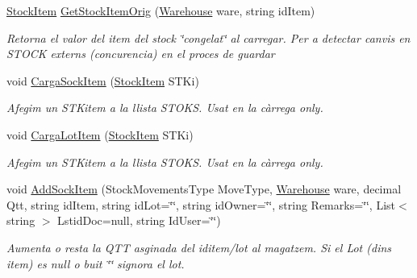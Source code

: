 \begin{DoxyCompactItemize}
\mbox{\hyperlink{class_h_k_supply_1_1_p_r_j___stocks_1_1_classes_1_1_stocks_1_1_stock_item}{Stock\+Item}} \mbox{\hyperlink{class_h_k_supply_1_1_p_r_j___stocks_1_1_classes_1_1_stocks_a9f91bf0312629b1ea7fc09f56a5e442c}{Get\+Stock\+Item\+Orig}} (\mbox{\hyperlink{class_h_k_supply_1_1_p_r_j___stocks_1_1_classes_1_1_stocks_1_1_warehouse}{Warehouse}} ware, string id\+Item)
\begin{DoxyCompactList}\small\item\em Retorna el valor del item del stock \char`\"{}congelat\char`\"{} al carregar. Per a detectar canvis en S\+T\+O\+CK externs (concurencia) en el proces de guardar \end{DoxyCompactList}\item 
void \mbox{\hyperlink{class_h_k_supply_1_1_p_r_j___stocks_1_1_classes_1_1_stocks_a67e7ea646fc0436283d053902a4eccb2}{Carga\+Sock\+Item}} (\mbox{\hyperlink{class_h_k_supply_1_1_p_r_j___stocks_1_1_classes_1_1_stocks_1_1_stock_item}{Stock\+Item}} S\+T\+Ki)
\begin{DoxyCompactList}\small\item\em Afegim un S\+T\+Kitem a la llista S\+T\+O\+KS. Usat en la càrrega only. \end{DoxyCompactList}\item 
void \mbox{\hyperlink{class_h_k_supply_1_1_p_r_j___stocks_1_1_classes_1_1_stocks_ac9f4ca2a80f2c759ddc67d127d65c974}{Carga\+Lot\+Item}} (\mbox{\hyperlink{class_h_k_supply_1_1_p_r_j___stocks_1_1_classes_1_1_stocks_1_1_stock_item}{Stock\+Item}} S\+T\+Ki)
\begin{DoxyCompactList}\small\item\em Afegim un S\+T\+Kitem a la llista S\+T\+O\+KS. Usat en la càrrega only. \end{DoxyCompactList}\item 
void \mbox{\hyperlink{class_h_k_supply_1_1_p_r_j___stocks_1_1_classes_1_1_stocks_a8d5d9d499ae9b864319d1abf46ac7705}{Add\+Sock\+Item}} (Stock\+Movements\+Type Move\+Type, \mbox{\hyperlink{class_h_k_supply_1_1_p_r_j___stocks_1_1_classes_1_1_stocks_1_1_warehouse}{Warehouse}} ware, decimal Qtt, string id\+Item, string id\+Lot=\char`\"{}\char`\"{}, string id\+Owner=\char`\"{}\char`\"{}, string Remarks=\char`\"{}\char`\"{}, List$<$ string $>$ Lstid\+Doc=null, string Id\+User=\char`\"{}\char`\"{})
\begin{DoxyCompactList}\small\item\em Aumenta o resta la Q\+TT asginada del iditem/lot al magatzem. Si el Lot (dins item) es null o buit \char`\"{}\char`\"{} s\textquotesingle{}ignora el lot. \end{DoxyCompactList}\item 

\end{DoxyCompactItemize}
